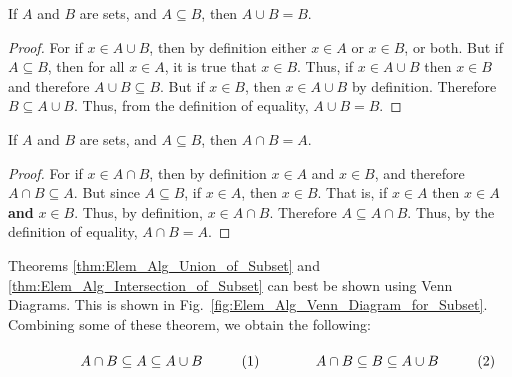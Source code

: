 \documentclass[crop=false,class=book,oneside]{standalone}                      %
\begin{document}
            \begin{theorem}
                \label{thm:Elem_Alg_Union_of_Subset}
                If $A$ and $B$ are sets, and $A\subseteq{B}$,
                then $A\cup{B}=B$.
            \end{theorem}
            \begin{proof}
                For if $x\in{A\cup{B}}$, then by definition
                either $x\in{A}$ or $x\in{B}$, or both. But
                if $A\subseteq{B}$, then for all $x\in{A}$, it is
                true that $x\in{B}$. Thus, if $x\in{A}\cup{B}$
                then $x\in{B}$ and therefore
                $A\cup{B}\subseteq{B}$. But if $x\in{B}$, then
                $x\in{A}\cup{B}$ by definition. Therefore
                $B\subseteq{A}\cup{B}$. Thus, from the definition
                of equality, $A\cup{B}=B$.
            \end{proof}
            \begin{theorem}
                \label{thm:Elem_Alg_Intersection_of_Subset}
                If $A$ and $B$ are sets, and $A\subseteq{B}$,
                then $A\cap{B}=A$.
            \end{theorem}
            \begin{proof}
                For if $x\in{A}\cap{B}$, then by
                definition $x\in{A}$ and $x\in{B}$,
                and therefore ${A}\cap{B}\subseteq{A}$.
                But since $A\subseteq{B}$, if
                $x\in{A}$, then $x\in{B}$. That is, if
                $x\in{A}$ then $x\in{A}$ \textbf{and} $x\in{B}$.
                Thus, by definition, $x\in{A}\cap{B}$.
                Therefore $A\subseteq{A}\cap{B}$. Thus, by
                the definition of equality,
                $A\cap{B}=A$.
            \end{proof}
            Theorems \ref{thm:Elem_Alg_Union_of_Subset} and
            \ref{thm:Elem_Alg_Intersection_of_Subset} can best
            be shown using Venn Diagrams. This is shown
            in Fig.~\ref{fig:Elem_Alg_Venn_Diagram_for_Subset}.
            Combining some of these theorem, we obtain the
            following:
            \par
            \vspace{1ex}
            \begin{subequations}
                \begin{minipage}{0.49\textwidth}
                    \begin{equation}
                        A\cap{B}\subseteq{A}\subseteq{A}\cup{B}
                    \end{equation}
                \end{minipage}
                \hfill
                \begin{minipage}{0.49\textwidth}
                    \begin{equation}
                        A\cap{B}\subseteq{B}\subseteq{A}\cup{B}
                    \end{equation}
                \end{minipage}
            \end{subequations}
\end{document}
